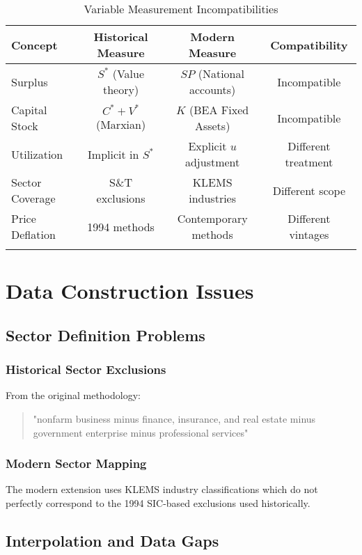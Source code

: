\documentclass[12pt]{article}
\begin{document}
\begin{longtable}{lccc}
\toprule
\textbf{Concept} & \textbf{Historical Measure} & \textbf{Modern Measure} & \textbf{Compatibility} \\
\midrule
\endhead
Surplus & $S^*$ (Value theory) & $SP$ (National accounts) & Incompatible \\
Capital Stock & $C^* + V^*$ (Marxian) & $K$ (BEA Fixed Assets) & Incompatible \\
Utilization & Implicit in $S^*$ & Explicit $u$ adjustment & Different treatment \\
Sector Coverage & S\&T exclusions & KLEMS industries & Different scope \\
Price Deflation & 1994 methods & Contemporary methods & Different vintages \\
\bottomrule
\caption{Variable Measurement Incompatibilities}
\label{tab:variable_differences}
\end{longtable}

\section{Data Construction Issues}

\subsection{Sector Definition Problems}

\subsubsection{Historical Sector Exclusions}
From the original methodology:
\begin{quote}
"nonfarm business minus finance, insurance, and real estate minus government enterprise minus professional services"
\end{quote}

\subsubsection{Modern Sector Mapping}
The modern extension uses KLEMS industry classifications which do not perfectly correspond to the 1994 SIC-based exclusions used historically.

\subsection{Interpolation and Data Gaps}
\end{document}
